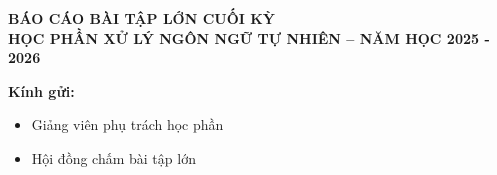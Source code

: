 \documentclass[12pt,a4paper]{article}
\begin{document}
\begin{center}
    {\fontsize{14}{17}\bfseries BÁO CÁO BÀI TẬP LỚN CUỐI KỲ}\\[4pt]
    {\fontsize{13}{16}\bfseries HỌC PHẦN XỬ LÝ NGÔN NGỮ TỰ NHIÊN -- NĂM HỌC 2025 - 2026}
\end{center}

\vspace{4pt}
\noindent\textbf{Kính gửi:}
\begin{itemize}
    \item Giảng viên phụ trách học phần
    \item Hội đồng chấm bài tập lớn
\end{itemize}








\end{document}
